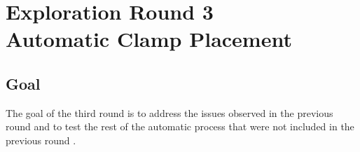 \chapter[Exploration Round 3 - Automatic Clamp Placement]{Exploration Round 3\\Automatic Clamp Placement}
\label{chapter:exploration-round-3}

\section{Goal}
\label{section:exploration-3-goal}

The goal of the third round is to address the issues observed in the previous round and to test the rest of the automatic process that were not included in the previous round .

